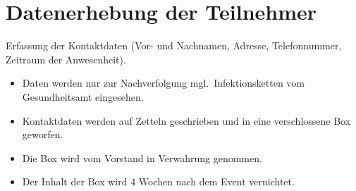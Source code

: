 \documentclass[10pt,a4paper]{scrartcl}
\begin{document}
\section{Datenerhebung der Teilnehmer}
Erfassung der Kontaktdaten (Vor- und Nachnamen, Adresse, Telefonnummer, Zeitraum der Anwesenheit).
\begin{itemize}
  \item Daten werden nur zur Nachverfolgung mgl.\ Infektionsketten vom Gesundheitsamt eingesehen.
  \item Kontaktdaten werden auf Zetteln geschrieben und in eine verschlossene Box geworfen.
  \item Die Box wird vom Vorstand in Verwahrung genommen.
  \item Der Inhalt der Box wird 4 Wochen nach dem Event vernichtet.
\end{itemize}
\end{document}
